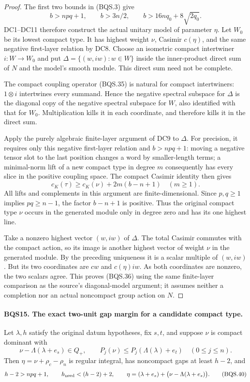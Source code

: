\begin{proof}
The first two bounds in (BQS.3) give
\[
 b>npq+1,\qquad b>3n/2,\qquad
 b>16nq_0+8\sqrt{2q_0}.
 \tag{BQS.37}
\]
DC1--DC11 therefore construct the actual unitary model of parameter
$\eta$.  Let $W_0$ be its lowest compact type.  It has highest weight
$\nu$, Casimir $c(\eta)$, and the same negative first-layer relation
by DC8.  Choose an isometric compact intertwiner $i:W\to W_0$ and
put $\Delta=\{(w,iw):w\in W\}$ inside the inner-product direct sum
of $N$ and the model's smooth module.
This direct sum need not be complete.

The compact coupling operator (BQS.35) is natural for compact
intertwiners: $1\otimes i$ intertwines every summand.  Hence the
negative spectral subspace for $\Delta$ is the diagonal copy of the
negative spectral subspace for $W$, also identified with that for
$W_0$.  Multiplication kills it in each coordinate, and therefore
kills it in the direct sum.

Apply the purely algebraic finite-layer argument of DC9 to $\Delta$.
For precision, it requires only this negative first-layer relation
and $b>npq+1$: moving a negative tensor slot to the last position
changes a word by smaller-length terms; a minimal-norm lift of a new
compact type in degree $m$ consequently has every slice in the positive
coupling space.  The compact Casimir identity then gives
\[
 c_K(\tau)\ge c_K(\nu)+2m(b-n+1)\quad(m\ge1).
 \tag{BQS.38}
\]
All lifts and complements in this argument are finite-dimensional.
Since $p,q\ge1$ implies $pq\ge n-1$, the factor $b-n+1$ is positive.
Thus the original compact type $\nu$ occurs in the generated module
only in degree zero and has its one highest line.

Take a nonzero highest vector $(w,iw)$ of $\Delta$.
The total Casimir commutes with the compact action, so its image is
another highest vector of weight $\nu$ in the generated module.
By the preceding uniqueness it is a scalar multiple of $(w,iw)$.
But its two coordinates are $cw$ and $c(\eta)iw$.
As both coordinates are nonzero, the two scalars agree.
This proves (BQS.36) using the same finite-layer comparison as the
source's diagonal-model argument; it assumes neither a completion nor
an actual noncompact group action on $N$.
\end{proof}

\paragraph{BQS15. The exact two-unit gap margin for a candidate compact type.}
\label{claim:BQS15}
Let $\lambda,h$ satisfy the original datum hypotheses, fix $s,t$, and
suppose $\nu$ is compact dominant with
\[
 \nu-\Lambda(\lambda+e_s)\in Q_+,\qquad
 P_j(\nu)\le P_j(\Lambda(\lambda)+e_t)\quad(0\le j\le n).
 \tag{BQS.39}
\]
Then $\eta=\nu+\rho_c-\rho_n$ is regular integral, has noncompact
gaps at least $h-2$, and
\[
 h-2>npq+1,\qquad h_{\rm need}< (h-2)+2,\qquad
 \eta=(\lambda+e_s)+
                 \bigl(\nu-\Lambda(\lambda+e_s)\bigr).
 \tag{BQS.40}
\]

